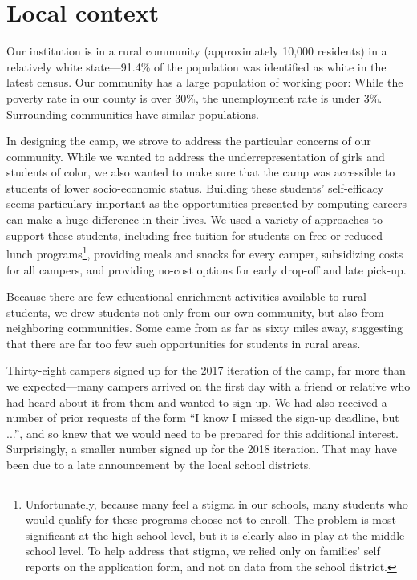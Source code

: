 \section{Local context}

Our institution is in a rural community (approximately 10,000
residents) in a relatively white state---91.4\% of the population was
identified as white in the latest census.  Our community has a large
population of working poor: While the poverty rate in our county
is over 30\%, the unemployment rate is under 3\%.  Surrounding
communities have similar populations.

In designing the camp, we strove to address the particular concerns
of our community.  While we wanted to address the underrepresentation
of girls and students of color, we also wanted to make sure that
the camp was accessible to students of lower socio-economic status.
Building these students' self-efficacy seems particulary important
as the opportunities presented by computing careers can make a huge
difference in their lives.  We used a variety of approaches to
support these students, including free tuition for students on free
or reduced lunch programs\footnote{Unfortunately, because many feel
a stigma in our schools, many students who would qualify for these
programs choose not to enroll.  The problem is most significant at
the high-school level, but it is clearly also in play at the
middle-school level.  To help address that stigma, we relied only
on families' self reports on the application form, and not on data
from the school district.}, providing meals and snacks for every
camper, subsidizing costs for all campers, and providing no-cost
options for early drop-off and late pick-up.

Because there are few educational enrichment activities available
to rural students, we drew students not only from our own community,
but also from neighboring communities.  Some came from as far as
sixty miles away, suggesting that there are far too few such
opportunities for students in rural areas.

Thirty-eight campers signed up for the 2017 iteration of the camp, 
far more than we expected---many campers arrived on the first day
with a friend or relative who had heard about it from them and
wanted to sign up.  We had also received a number of prior requests
of the form ``I know I missed the sign-up deadline, but ...'', and
so knew that we would need to be prepared for this additional
interest.  Surprisingly, a smaller number signed up for the 2018
iteration.  That may have been due to a late announcement by the
local school districts.

